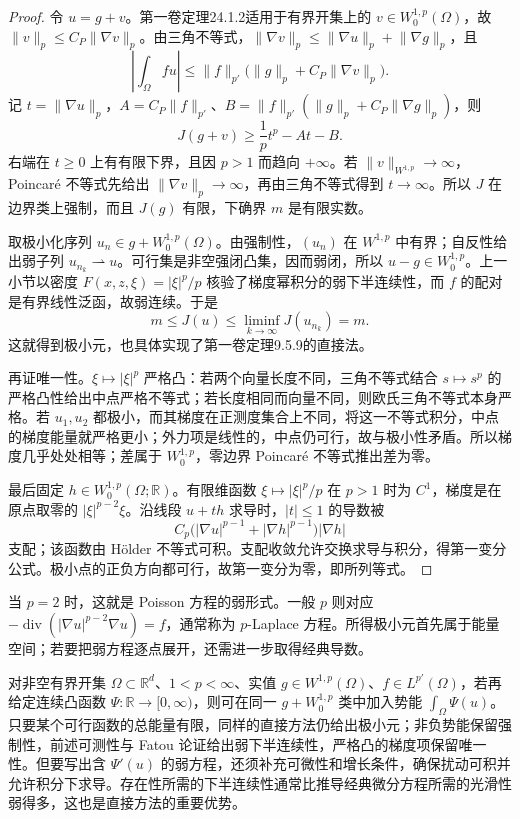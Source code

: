 \begin{proof}
令 \(u=g+v\)。第一卷定理24.1.2适用于有界开集上的 \(v\in W_0^{1,p}(\Omega)\)，故 \(\|v\|_p\leq C_P\|\nabla v\|_p\)。由三角不等式，\(\lVert\nabla v\rVert_p\le\lVert\nabla u\rVert_p+\lVert\nabla g\rVert_p\)，且
\[\left|\int_\Omega fu\right|\le\lVert f\rVert_{p'}\bigl(\lVert g\rVert_p+C_P\lVert\nabla v\rVert_p\bigr).\]
记 \(t=\|\nabla u\|_p\)，\(A=C_P\|f\|_{p'}\)、\(B=\|f\|_{p'}(\|g\|_p+C_P\|\nabla g\|_p)\)，则
\[
 J(g+v)\geq\frac1p t^p-At-B.
\]
右端在 \(t\geq0\) 上有有限下界，且因 \(p>1\) 而趋向 \(+\infty\)。若 \(\|v\|_{W^{1,p}}\to\infty\)，Poincaré 不等式先给出 \(\|\nabla v\|_p\to\infty\)，再由三角不等式得到 \(t\to\infty\)。所以 \(J\) 在边界类上强制，而且 \(J(g)\) 有限，下确界 \(m\) 是有限实数。

取极小化序列 \(u_n\in g+W_0^{1,p}(\Omega)\)。由强制性，\((u_n)\) 在 \(W^{1,p}\) 中有界；自反性给出弱子列 \(u_{n_k}\rightharpoonup u\)。可行集是非空强闭凸集，因而弱闭，所以 \(u-g\in W_0^{1,p}\)。上一小节以密度 \(F(x,z,\xi)=|\xi|^p/p\) 核验了梯度幂积分的弱下半连续性，而 \(f\) 的配对是有界线性泛函，故弱连续。于是
\[
 m\leq J(u)\leq\liminf_{k\to\infty}J(u_{n_k})=m.
\]
这就得到极小元，也具体实现了第一卷定理9.5.9的直接法。

再证唯一性。\(\xi\mapsto|\xi|^p\) 严格凸：若两个向量长度不同，三角不等式结合 \(s\mapsto s^p\) 的严格凸性给出中点严格不等式；若长度相同而向量不同，则欧氏三角不等式本身严格。若 \(u_1,u_2\) 都极小，而其梯度在正测度集合上不同，将这一不等式积分，中点的梯度能量就严格更小；外力项是线性的，中点仍可行，故与极小性矛盾。所以梯度几乎处处相等；差属于 \(W_0^{1,p}\)，零边界 Poincaré 不等式推出差为零。

最后固定 \(h\in W_0^{1,p}(\Omega;\mathbb R)\)。有限维函数 \(\xi\mapsto|\xi|^p/p\) 在 \(p>1\) 时为 \(C^1\)，梯度是在原点取零的 \(|\xi|^{p-2}\xi\)。沿线段 \(u+th\) 求导时，\(|t|\le1\) 的导数被
\[C_p\bigl(|\nabla u|^{p-1}+|\nabla h|^{p-1}\bigr)|\nabla h|\]
支配；该函数由 Hölder 不等式可积。支配收敛允许交换求导与积分，得第一变分公式。极小点的正负方向都可行，故第一变分为零，即所列等式。
\end{proof}

当 \(p=2\) 时，这就是 Poisson 方程的弱形式。一般 \(p\) 则对应 \(-\operatorname{div}(|\nabla u|^{p-2}\nabla u)=f\)，通常称为 \(p\)-Laplace 方程。所得极小元首先属于能量空间；若要把弱方程逐点展开，还需进一步取得经典导数。

\ProseParagraphBreak

对非空有界开集 \(\Omega\subset\mathbb R^d\)、\(1<p<\infty\)、实值 \(g\in W^{1,p}(\Omega)\)、\(f\in L^{p'}(\Omega)\)，若再给定连续凸函数 \(\Psi:\mathbb R\to[0,\infty)\)，则可在同一 \(g+W_0^{1,p}\) 类中加入势能 \(\int_\Omega\Psi(u)\)。只要某个可行函数的总能量有限，同样的直接方法仍给出极小元；非负势能保留强制性，前述可测性与 Fatou 论证给出弱下半连续性，严格凸的梯度项保留唯一性。但要写出含 \(\Psi'(u)\) 的弱方程，还须补充可微性和增长条件，确保扰动可积并允许积分下求导。存在性所需的下半连续性通常比推导经典微分方程所需的光滑性弱得多，这也是直接方法的重要优势。



